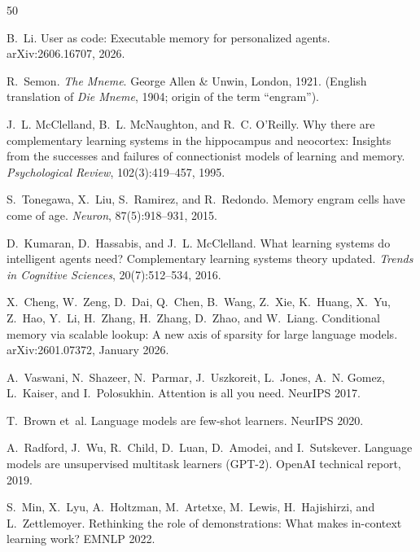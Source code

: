\documentclass[11pt]{article}
\begin{document}

\begin{thebibliography}{50}

B.~Li.
\newblock User as code: Executable memory for personalized agents.
\newblock arXiv:2606.16707, 2026.

R.~Semon.
\newblock \emph{The Mneme}.
\newblock George Allen \& Unwin, London, 1921.
\newblock (English translation of \emph{Die Mneme}, 1904; origin of
  the term ``engram'').

J.~L. McClelland, B.~L. McNaughton, and R.~C. O'Reilly.
\newblock Why there are complementary learning systems in the
  hippocampus and neocortex: Insights from the successes and failures
  of connectionist models of learning and memory.
\newblock \emph{Psychological Review}, 102(3):419--457, 1995.

S.~Tonegawa, X.~Liu, S.~Ramirez, and R.~Redondo.
\newblock Memory engram cells have come of age.
\newblock \emph{Neuron}, 87(5):918--931, 2015.

D.~Kumaran, D.~Hassabis, and J.~L. McClelland.
\newblock What learning systems do intelligent agents need?
  Complementary learning systems theory updated.
\newblock \emph{Trends in Cognitive Sciences}, 20(7):512--534, 2016.

X.~Cheng, W.~Zeng, D.~Dai, Q.~Chen, B.~Wang, Z.~Xie, K.~Huang, X.~Yu, Z.~Hao,
  Y.~Li, H.~Zhang, H.~Zhang, D.~Zhao, and W.~Liang.
\newblock Conditional memory via scalable lookup: A new axis of sparsity for
  large language models.
\newblock arXiv:2601.07372, January 2026.

A.~Vaswani, N.~Shazeer, N.~Parmar, J.~Uszkoreit, L.~Jones, A.~N. Gomez,
  L.~Kaiser, and I.~Polosukhin.
\newblock Attention is all you need.
\newblock NeurIPS 2017.

T.~Brown et~al.
\newblock Language models are few-shot learners.
\newblock NeurIPS 2020.

A.~Radford, J.~Wu, R.~Child, D.~Luan, D.~Amodei, and I.~Sutskever.
\newblock Language models are unsupervised multitask learners ({GPT-2}).
\newblock OpenAI technical report, 2019.

S.~Min, X.~Lyu, A.~Holtzman, M.~Artetxe, M.~Lewis, H.~Hajishirzi, and
  L.~Zettlemoyer.
\newblock Rethinking the role of demonstrations: What makes in-context learning
  work?
\newblock EMNLP 2022.


\end{thebibliography}
\end{document}

